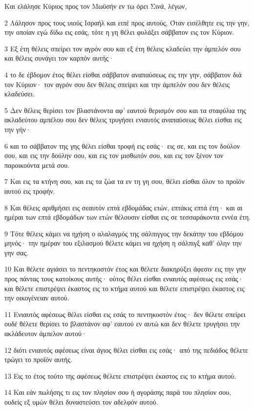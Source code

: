 \par Και ελάλησε Κύριος προς τον Μωϋσήν εν τω όρει Σινά, λέγων,
\par 2 Λάλησον προς τους υιούς Ισραήλ και ειπέ προς αυτούς, Όταν εισέλθητε εις την γην, την οποίαν εγώ δίδω εις εσάς, τότε η γη θέλει φυλάξει σάββατον εις τον Κύριον.
\par 3 Εξ έτη θέλεις σπείρει τον αγρόν σου και εξ έτη θέλεις κλαδεύει την άμπελόν σου και θέλεις συνάγει τον καρπόν αυτής·
\par 4 το δε έβδομον έτος θέλει είσθαι σάββατον αναπαύσεως εις την γην, σάββατον διά τον Κύριον· τον αγρόν σου δεν θέλεις σπείρει και την άμπελόν σου δεν θέλεις κλαδεύσει.
\par 5 Δεν θέλεις θερίσει τον βλαστάνοντα αφ' εαυτού θερισμόν σου και τα σταφύλια της ακλαδεύτου αμπέλου σου δεν θέλεις τρυγήσει ενιαυτός αναπαύσεως θέλει είσθαι εις την γήν·
\par 6 και το σάββατον της γης θέλει είσθαι τροφή εις εσάς· εις σε, και εις τον δούλον σου, και εις την δούλην σου, και εις τον μισθωτόν σου, και εις τον ξένον τον παροικούντα μετά σου.
\par 7 Και εις τα κτήνη σου, και εις τα ζώα τα εν τη γη σου, θέλει είσθαι όλον το προϊόν αυτού εις τροφήν.
\par 8 Και θέλεις αριθμήσει εις σεαυτόν επτά εβδομάδας ετών, επτάκις επτά έτη· και αι ημέραι των επτά εβδομάδων των ετών θέλουσιν είσθαι εις σε τεσσαράκοντα εννέα έτη.
\par 9 Τότε θέλεις κάμει να ηχήση ο αλαλαγμός της σάλπιγγος την δεκάτην του εβδόμου μηνός· την ημέραν του εξιλασμού θέλετε κάμει να ηχήση η σάλπιγξ καθ' όλην την γην σας.
\par 10 Και θέλετε αγιάσει το πεντηκοστόν έτος και θέλετε διακηρύξει άφεσιν εις την γην προς πάντας τους κατοίκους αυτής· ούτος θέλει είσθαι ενιαυτός αφέσεως εις εσάς· και θέλετε επιστρέψει έκαστος εις το κτήμα αυτού και θέλετε επιστρέψει έκαστος εις την οικογένειαν αυτού.
\par 11 Ενιαυτός αφέσεως θέλει είσθαι εις εσάς το πεντηκοστόν έτος· δεν θέλετε σπείρει ουδέ θέλετε θερίσει το βλαστάνον αφ' εαυτού εν αυτώ και δεν θέλετε τρυγήσει την ακλάδευτον άμπελον αυτού·
\par 12 διότι ενιαυτός αφέσεως είναι άγιος θέλει είσθαι εις εσάς· από της πεδιάδος θέλετε τρώγει το προϊόν αυτής.
\par 13 Εις το έτος τούτο της αφέσεως θέλετε επιστρέψει έκαστος εις το κτήμα αυτού.
\par 14 Και εάν πωλήσης τι εις τον πλησίον σου ή αγοράσης παρά του πλησίον σου, ουδείς εξ υμών θέλει δυναστεύσει τον αδελφόν αυτού.
